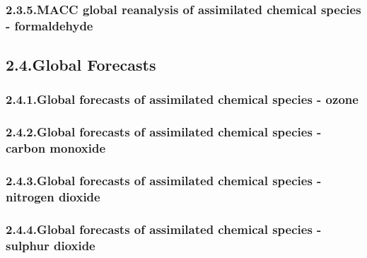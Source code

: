 \documentclass[9pt]{report}
\begin{document}
\subsubsection{2.3.5.\hspace*{0.5em}MACC global reanalysis of assimilated chemical species - formaldehyde}\label{sec-macc-global-reanalysis-of-assimilated-chemical-species---formaldehyde}%

\subsection{2.4.\hspace*{0.5em}Global Forecasts}\label{sec-global-forecasts}%

\subsubsection{2.4.1.\hspace*{0.5em}Global forecasts of assimilated chemical species - ozone}\label{sec-global-forecasts-of-assimilated-chemical-species---ozone}%

\subsubsection{2.4.2.\hspace*{0.5em}Global forecasts of assimilated chemical species - carbon monoxide}\label{sec-global-forecasts-of-assimilated-chemical-species---carbon-monoxide}%

\subsubsection{2.4.3.\hspace*{0.5em}Global forecasts of assimilated chemical species - nitrogen dioxide}\label{sec-global-forecasts-of-assimilated-chemical-species---nitrogen-dioxide}%

\subsubsection{2.4.4.\hspace*{0.5em}Global forecasts of assimilated chemical species - sulphur dioxide}\label{sec-global-forecasts-of-assimilated-chemical-species---sulphur-dioxide}%
\end{document}
